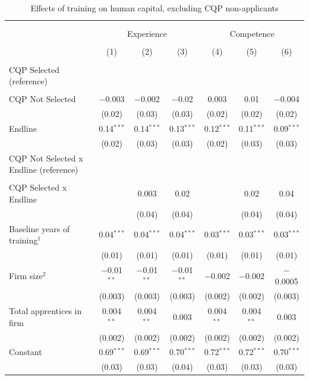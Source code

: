 \documentclass[
  11pt,
a4paper
]{report}
\begin{document}
\begin{adjustbox}{center}
\begin{table}[H] \centering 
  \caption{Effects of training on human capital, excluding CQP non-applicants} 
  \label{tab:tbl-appreg2} 
\small 
\begin{tabular}{@{\extracolsep{-8pt}}lcccccc} 
\\[-1.8ex]\hline 
\hline \\[-1.8ex] 
\\[-1.8ex] & \multicolumn{3}{c}{Experience} & \multicolumn{3}{c}{Competence} \\ 
\\[-1.8ex] & (1) & (2) & (3) & (4) & (5) & (6)\\ 
\hline \\[-1.8ex] 
 CQP Selected (reference) \\ \\ CQP Not Selected & $-$0.003 & $-$0.002 & $-$0.02 & 0.003 & 0.01 & $-$0.004 \\ 
  & (0.02) & (0.03) & (0.03) & (0.02) & (0.02) & (0.02) \\ 
  Endline & 0.14$^{***}$ & 0.14$^{***}$ & 0.13$^{***}$ & 0.12$^{***}$ & 0.11$^{***}$ & 0.09$^{***}$ \\ 
  & (0.02) & (0.03) & (0.03) & (0.02) & (0.03) & (0.03) \\ 
  CQP Not Selected x Endline (reference) \\ \\ CQP Selected x Endline &  & 0.003 & 0.02 &  & 0.02 & 0.04 \\ 
  &  & (0.04) & (0.04) &  & (0.04) & (0.04) \\ 
  Baseline years of training$^1$ & 0.04$^{***}$ & 0.04$^{***}$ & 0.04$^{***}$ & 0.03$^{***}$ & 0.03$^{***}$ & 0.03$^{***}$ \\ 
  & (0.01) & (0.01) & (0.01) & (0.01) & (0.01) & (0.01) \\ 
  Firm size$^2$ & $-$0.01$^{**}$ & $-$0.01$^{**}$ & $-$0.01$^{**}$ & $-$0.002 & $-$0.002 & $-$0.0005 \\ 
  & (0.003) & (0.003) & (0.003) & (0.002) & (0.002) & (0.003) \\ 
  Total apprentices in firm & 0.004$^{**}$ & 0.004$^{**}$ & 0.003 & 0.004$^{**}$ & 0.004$^{**}$ & 0.003 \\ 
  & (0.002) & (0.002) & (0.002) & (0.002) & (0.002) & (0.002) \\ 
  Constant & 0.69$^{***}$ & 0.69$^{***}$ & 0.70$^{***}$ & 0.72$^{***}$ & 0.72$^{***}$ & 0.70$^{***}$ \\ 
  & (0.03) & (0.03) & (0.04) & (0.03) & (0.03) & (0.03) \\ 

\end{tabular}
\end{table}
\end{adjustbox}
\end{document}
